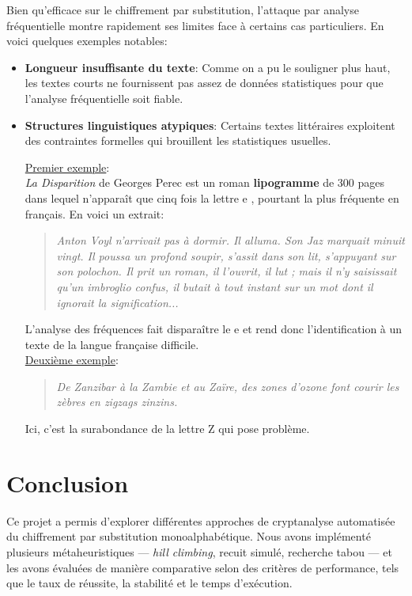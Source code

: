 \documentclass[a4paper]{article}
\begin{document}
Bien qu'efficace sur le chiffrement par substitution, l'attaque par analyse fréquentielle montre rapidement ses limites face à certains cas particuliers. En voici quelques exemples notables:
\begin{itemize}
    \item \textbf{Longueur insuffisante du texte}: Comme on a pu le souligner plus haut, les textes courts ne fournissent pas assez de données statistiques pour que l'analyse fréquentielle soit fiable.
    \item \textbf{Structures linguistiques atypiques}: Certains textes littéraires exploitent des contraintes formelles qui brouillent les statistiques usuelles. 

    \underline{Premier exemple}:\\

    \textit{La Disparition} de Georges Perec est un roman \textbf{lipogramme} de 300 pages dans lequel n'apparaît que cinq fois la lettre \og e \fg{}, pourtant la plus fréquente en français. En voici un extrait:

    \begin{quote}
        \textit{Anton Voyl n’arrivait pas à dormir. Il alluma. Son Jaz marquait minuit vingt. Il poussa un profond soupir, s’assit dans son lit, s’appuyant sur son polochon. Il prit un roman, il l’ouvrit, il lut ; mais il n’y saisissait qu’un imbroglio confus, il butait à tout instant sur un mot dont il ignorait la signification...}
    \end{quote}

    L’analyse des fréquences fait disparaître le \og e \fg{} et rend donc l'identification à un texte de la langue française difficile.\\

    \underline{Deuxième exemple}:

    \begin{quote}
        \textit{De Zanzibar à la Zambie et au Zaïre, des zones d’ozone font courir les zèbres en zigzags zinzins.}
    \end{quote}

    Ici, c’est la surabondance de la lettre \og Z \fg{} qui pose problème.

\end{itemize}

\section{Conclusion}

Ce projet a permis d’explorer différentes approches de cryptanalyse automatisée du chiffrement par substitution monoalphabétique. Nous avons implémenté plusieurs métaheuristiques — \textit{hill climbing}, recuit simulé, recherche tabou — et les avons évaluées de manière comparative selon des critères de performance, tels que le taux de réussite, la stabilité et le temps d’exécution.
\end{document}
